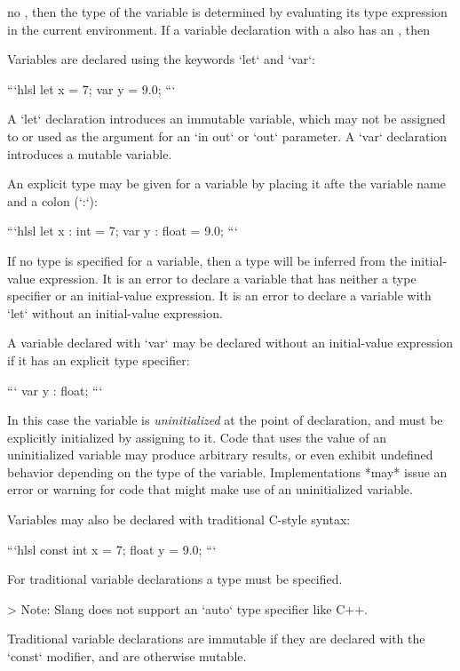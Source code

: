 no , then the type of the variable is determined by evaluating its type expression in the current environment.
If a variable declaration with a  also has an , then 

Variables are declared using the keywords `let` and `var`:

```hlsl
let x = 7;
var y = 9.0;
```

A `let` declaration introduces an immutable variable, which may not be assigned to or used as the argument for an `in out` or `out` parameter.
A `var` declaration introduces a mutable variable.

An explicit type may be given for a variable by placing it afte the variable name and a colon (`:`):

```hlsl
let x : int = 7;
var y : float = 9.0;
```

If no type is specified for a variable, then a type will be inferred from the initial-value expression.
It is an error to declare a variable that has neither a type specifier or an initial-value expression.
It is an error to declare a variable with `let` without an initial-value expression.

A variable declared with `var` may be declared without an initial-value expression if it has an explicit type specifier:

```
var y : float;
```

In this case the variable is  \emph{uninitialized} at the point of declaration, and must be explicitly initialized by assigning to it.
Code that uses the value of an uninitialized variable may produce arbitrary results, or even exhibit undefined behavior depending on the type of the variable.
Implementations *may* issue an error or warning for code that might make use of an uninitialized variable.


Variables may also be declared with traditional C-style syntax:

```hlsl
const int x = 7;
float y = 9.0;
```

For traditional variable declarations a type must be specified.

> Note: Slang does not support an `auto` type specifier like C++.

Traditional variable declarations are immutable if they are declared with the `const` modifier, and are otherwise mutable.


